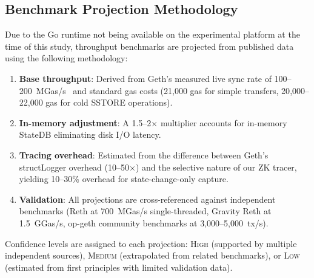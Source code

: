 \subsection{Benchmark Projection Methodology}

Due to the Go runtime not being available on the experimental platform at the
time of this study, throughput benchmarks are projected from published data
using the following methodology:

\begin{enumerate}
  \item \textbf{Base throughput}: Derived from Geth's measured live sync rate of
    100--200~MGas/s~\cite{paradigm2024reth} and standard gas costs (21{,}000 gas
    for simple transfers, 20{,}000--22{,}000 gas for cold SSTORE operations).
  \item \textbf{In-memory adjustment}: A 1.5--2$\times$ multiplier accounts for
    in-memory StateDB eliminating disk I/O latency.
  \item \textbf{Tracing overhead}: Estimated from the difference between Geth's
    structLogger overhead (10--50$\times$) and the selective nature of our ZK
    tracer, yielding 10--30\% overhead for state-change-only capture.
  \item \textbf{Validation}: All projections are cross-referenced against
    independent benchmarks (Reth at 700~MGas/s single-threaded, Gravity Reth
    at 1.5~GGas/s, op-geth community benchmarks at 3{,}000--5{,}000~tx/s).
\end{enumerate}

Confidence levels are assigned to each projection: \textsc{High} (supported by
multiple independent sources), \textsc{Medium} (extrapolated from related
benchmarks), or \textsc{Low} (estimated from first principles with limited
validation data).
